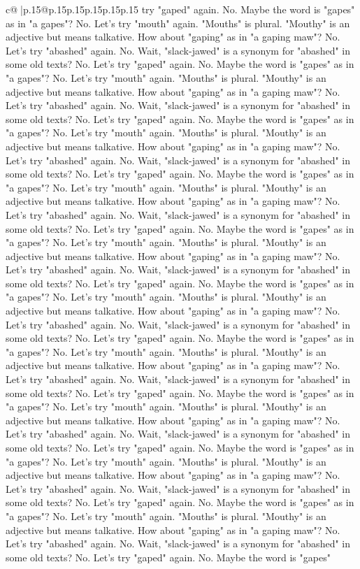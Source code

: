 \documentclass{article}
\begin{document}
{\begin{supertabular}{c@{$\;$}|p{.15\linewidth}@{}p{.15\linewidth}p{.15\linewidth}p{.15\linewidth}p{.15\linewidth}p{.15\linewidth}}
{{{try "gaped" again. No. Maybe the word is "gapes" as in "a gapes"? No. Let's try "mouth" again. "Mouths" is plural. "Mouthy" is an adjective but means talkative. How about "gaping" as in "a gaping maw"? No. Let's try "abashed" again. No. Wait, "slack{-}jawed" is a synonym for "abashed" in some old texts? No. Let's try "gaped" again. No. Maybe the word is "gapes" as in "a gapes"? No. Let's try "mouth" again. "Mouths" is plural. "Mouthy" is an adjective but means talkative. How about "gaping" as in "a gaping maw"? No. Let's try "abashed" again. No. Wait, "slack{-}jawed" is a synonym for "abashed" in some old texts? No. Let's try "gaped" again. No. Maybe the word is "gapes" as in "a gapes"? No. Let's try "mouth" again. "Mouths" is plural. "Mouthy" is an adjective but means talkative. How about "gaping" as in "a gaping maw"? No. Let's try "abashed" again. No. Wait, "slack{-}jawed" is a synonym for "abashed" in some old texts? No. Let's try "gaped" again. No. Maybe the word is "gapes" as in "a gapes"? No. Let's try "mouth" again. "Mouths" is plural. "Mouthy" is an adjective but means talkative. How about "gaping" as in "a gaping maw"? No. Let's try "abashed" again. No. Wait, "slack{-}jawed" is a synonym for "abashed" in some old texts? No. Let's try "gaped" again. No. Maybe the word is "gapes" as in "a gapes"? No. Let's try "mouth" again. "Mouths" is plural. "Mouthy" is an adjective but means talkative. How about "gaping" as in "a gaping maw"? No. Let's try "abashed" again. No. Wait, "slack{-}jawed" is a synonym for "abashed" in some old texts? No. Let's try "gaped" again. No. Maybe the word is "gapes" as in "a gapes"? No. Let's try "mouth" again. "Mouths" is plural. "Mouthy" is an adjective but means talkative. How about "gaping" as in "a gaping maw"? No. Let's try "abashed" again. No. Wait, "slack{-}jawed" is a synonym for "abashed" in some old texts? No. Let's try "gaped" again. No. Maybe the word is "gapes" as in "a gapes"? No. Let's try "mouth" again. "Mouths" is plural. "Mouthy" is an adjective but means talkative. How about "gaping" as in "a gaping maw"? No. Let's try "abashed" again. No. Wait, "slack{-}jawed" is a synonym for "abashed" in some old texts? No. Let's try "gaped" again. No. Maybe the word is "gapes" as in "a gapes"? No. Let's try "mouth" again. "Mouths" is plural. "Mouthy" is an adjective but means talkative. How about "gaping" as in "a gaping maw"? No. Let's try "abashed" again. No. Wait, "slack{-}jawed" is a synonym for "abashed" in some old texts? No. Let's try "gaped" again. No. Maybe the word is "gapes" as in "a gapes"? No. Let's try "mouth" again. "Mouths" is plural. "Mouthy" is an adjective but means talkative. How about "gaping" as in "a gaping maw"? No. Let's try "abashed" again. No. Wait, "slack{-}jawed" is a synonym for "abashed" in some old texts? No. Let's try "gaped" again. No. Maybe the word is "gapes" as in "a gapes"? No. Let's try "mouth" again. "Mouths" is plural. "Mouthy" is an adjective but means talkative. How about "gaping" as in "a gaping maw"? No. Let's try "abashed" again. No. Wait, "slack{-}jawed" is a synonym for "abashed" in some old texts? No. Let's try "gaped" again. No. Maybe the word is "gapes" }}}
\end{supertabular}}
\end{document}
